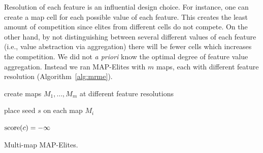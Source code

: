 Resolution of each feature is an influential design choice. For instance, one can create a map cell for each possible value of each feature. This creates the least amount of competition since elites from different cells do not compete. On the other hand, by not distinguishing between several different values of each feature (i.e., value abstraction via aggregation) there will be fewer cells which increases the competition. We did not {\em a priori} know the optimal degree of feature value aggregation. Instead we ran MAP-Elites with $m$ maps, each with different feature resolution (Algorithm~\ref{alg:mrme}). 

\begin{algorithm}[t]
\DontPrintSemicolon 
{

create maps $M_1, \dots, M_m$ at different feature resolutions \; \label{algl:createMaps}

place seed $s$ on each map $M_i$ \; \label{algl:placeInitialSeed}

$\operatorname{score}(c) = -\infty$ \;

 \label{algl:mainLoopE}
}
\caption{\sc Multi-map MAP-Elites.}
\label{alg:mrme}
\end{algorithm}


